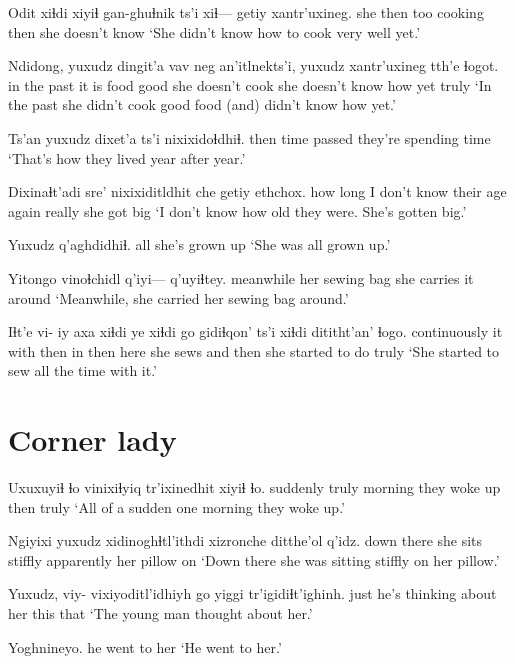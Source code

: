 \documentclass[12pt]{article}
\begin{document}
\gll Odit xiɬdi xiyiɬ gan-ghuɬnik ts'i xiɬ--- getiy xantr'uxineg.
she  then  too   cooking {} then {} {she doesn't know}
\glt `She didn't know how to cook very well yet.'
\glend

\gll Ndidong, yuxudz dingit'a vav neg   {an'itlnekts'i},  yuxudz xantr'uxineg     tth'e ɬogot.
{in the past}   {}       {it is}    food good {she doesn't cook} {}    {she doesn't know how} yet   truly
\glt `In the past she didn't cook good food (and) didn't know how yet.'
\glend

\gll Ts'an {yuxudz dixet'a} ts'i nixixidoɬdhiɬ.
then  {time passed}    {} {they're spending time}
\glt `That's how they lived year after year.'
\glend

\gll Dixinaɬt'adi sre'    nixixiditldhit che   getiy  ethchox.
{how long}     {I don't know} {their age}    again really {she got big}
\glt `I don't know how old they were. She's gotten big.'
\glend

\gll Yuxudz q'aghdidhiɬ.
all    {she's grown up}
\glt `She was all grown up.'
\glend

\gll Yitongo   vinoɬchidl  q'iyi--- q'uyiɬtey.
meanwhile {her sewing bag} {} {she carries it around}
\glt `Meanwhile, she carried her sewing bag around.'
\glend

\gll Iɬt'e vi-    iy axa xiɬdi ye xiɬdi go gidiɬqon' ts'i  xiɬdi dititht'an'       ɬogo.
continuously {} it with then in  then  here {she sews} and then  {she started to do} truly
\glt `She started to sew all the time with it.'
\glend

\section*{Corner lady}

\gll Uxuxuyiɬ ɬo    vinixiɬyiq tr'ixinedhit xiyiɬ  ɬo.
suddenly truly morning   {they woke up} then truly
\glt `All of a sudden one morning they woke up.'
\glend

\gll Ngiyixi    yuxudz xidinoghɬtl'ithdi   xizronche ditthe'ol  q'idz.
{down there} {}     {she sits stiffly} apparently    {her pillow} on
\glt `Down there she was sitting stiffly on her pillow.'
\glend

\gll Yuxudz, viy- vixiyoditl'idhiyh go    yiggi tr'igidiɬt'ighinh.
just {}   {he's thinking about her} this that 
\glt `The young man thought about her.'
\glend

\gll Yoghnineyo.
{{he went to her}}
\glt `He went to her.'
\glend
\end{document}
